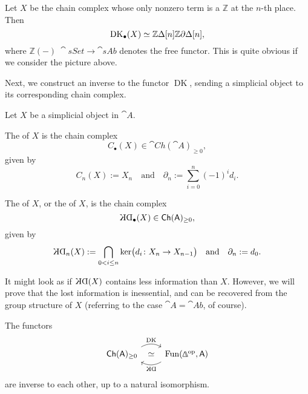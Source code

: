 \begin{example}
    Let $X$ be the chain complex whose only nonzero term
    is a $\mathbb{Z}$ at the $n$-th place. Then 
    \[\operatorname{DK}_\bullet(X)\simeq
    \mathbb{Z}\Delta[n]\/\mathbb{Z}\partial\Delta[n],\]
    where $\mathbb{Z}(-)\:\cat{sSet}\to\cat{sAb}$
    denotes the free functor.
    This is quite obvious if we consider the picture above. \varqed
\end{example}

Next, we construct an inverse to the functor $\operatorname{DK}$,
sending a simplicial object to its corresponding chain complex.

\begin{definition}
    Let $X$ be a simplicial object in $\cat{A}$.
    
    \begin{itms}
        \item
        The  of $X$ is the chain complex 
        \[C_\bullet(X)\in\cat{Ch}(\cat{A})_{\geq0},\]
        given by 
        \[C_n(X):=X_n\quad\text{and}\quad\partial_n:=\sum_{i=0}^n(-1)^id_i.\]

        \item 
        The  of $X$, or the
         of $X$, is the chain complex 
        \[\KD_\bullet(X)\in\cat{Ch}(\cat{A})_{\geq0},\]
        given by 
        \[\KD_n(X):=\bigcap_{0<i\leq n}\ker\bigl(d_i\:X_n\to X_{n-1}\bigr)
        \quad\text{and}\quad\partial_n:=d_0.\]
    \end{itms}
\end{definition}

It might look as if $\KD(X)$ contains less information than $X$.
However, we will prove that the lost information is inessential,
and can be recovered from the group structure of $X$
(referring to the case $\cat{A}=\cat{Ab}$, of course).

\begin{theorem}
    The functors
    \[\begin{tikzcd}
        \cat{Ch}(\cat{A})_{\geq0}
        \ar[r,bend left,start anchor=north east,end anchor=north west,"\operatorname{DK}"] 
        \ar[r,phantom,"\simeq"] &
        \operatorname{Fun}(\bfDelta\op,\cat{A})
        \ar[l,bend left,start anchor=south west,end anchor=south east,"\KD"]
    \end{tikzcd}\]
    are inverse to each other,
    up to a natural isomorphism.
\end{theorem}

